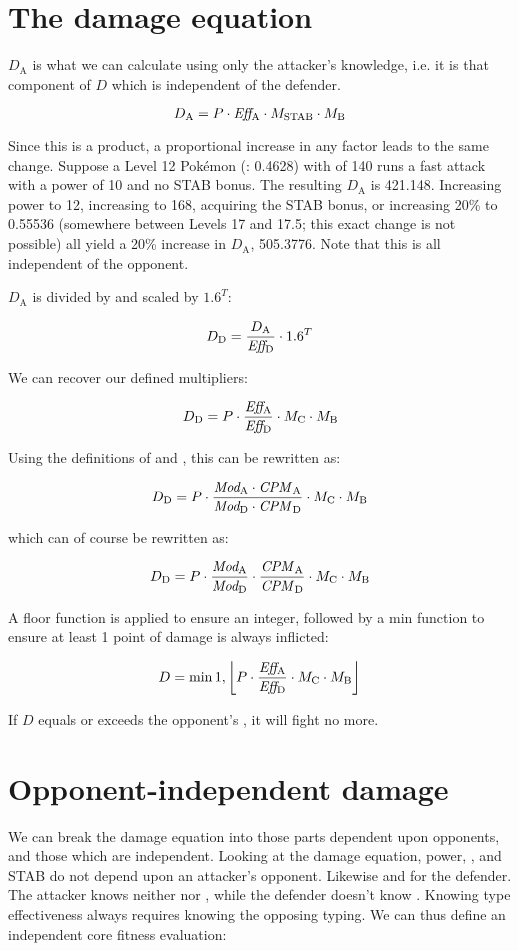 \section{The damage equation\label{sec:damage}}

$D_\mathrm{A}$ is what we can calculate using only the attacker's knowledge, i.e.
 it is that component of $D$ which is independent of the defender.

\[ D_\mathrm{A} = P \cdot \mbox{$\mathit{Eff_\mathrm{A}}$} \cdot M_\mathrm{STAB} \cdot M_\mathrm{B} \]

Since this is a product, a proportional increase in any factor leads to
 the same change.
Suppose a Level 12 Pokémon (\CPM: 0.4628) with  of 140 runs
  a fast attack with a power of 10 and no STAB bonus.
The resulting $D_\mathrm{A}$ is 421.148.
Increasing power to 12,
 increasing  to 168,
 acquiring the STAB bonus,
 or increasing \CPM{} 20\% to 0.55536 (somewhere between Levels 17 and 17.5; this exact change is not possible)
 all yield a 20\% increase in $D_\mathrm{A}$, 505.3776.
Note that this is all independent of the opponent.

$D_\mathrm{A}$ is divided by  and scaled by $1.6^T$:

\[ D_\mathrm{D} = \frac{D_\mathrm{A}}{\mbox{$\mathit{Eff_\mathrm{D}}$}} \cdot 1.6^T \]

We can recover our defined multipliers:

\[ D_\mathrm{D} = P \cdot \frac{\mbox{$\mathit{Eff_\mathrm{A}}$}}{\mbox{$\mathit{Eff_\mathrm{D}}$}} \cdot M_\mathrm{C} \cdot M_\mathrm{B} \]

Using the definitions of  and , this can be rewritten as:

\[ D_\mathrm{D} = P \cdot \frac{\mbox{$\mathit{Mod_\mathrm{A}}$} \cdot \mbox{$\mathit{CPM}$}_\mathrm{A}}{\mbox{$\mathit{Mod_\mathrm{D}}$} \cdot \mbox{$\mathit{CPM}$}_\mathrm{D}} \cdot M_\mathrm{C} \cdot M_\mathrm{B} \]

which can of course be rewritten as:

\[ D_\mathrm{D} = P \cdot \frac{\mbox{$\mathit{Mod_\mathrm{A}}$}}{\mbox{$\mathit{Mod_\mathrm{D}}$}} \cdot \frac{\mbox{$\mathit{CPM}$}_\mathrm{A}}{\mbox{$\mathit{CPM}$}_\mathrm{D}} \cdot M_\mathrm{C} \cdot M_\mathrm{B} \]

A floor function is applied to ensure an integer,
 followed by a min function to ensure at least 1 point of damage is always inflicted:

 \[ D = \min{1, \left\lfloor P \cdot \frac{\mbox{$\mathit{Eff_\mathrm{A}}$}}{\mbox{$\mathit{Eff_\mathrm{D}}$}} \cdot M_\mathrm{C} \cdot M_\mathrm{B} \right\rfloor } \]

If $D$ equals or exceeds the opponent's \HP, it will fight no more.

\section{Opponent-independent damage}
We can break the damage equation into those parts dependent upon opponents, and those which are independent.
Looking at the damage equation, power, , and STAB do not depend upon an attacker's opponent.
Likewise  and \MHP{} for the defender.
The attacker knows neither  nor \MHP, while the defender doesn't know .
Knowing type effectiveness always requires knowing the opposing typing.
We can thus define an independent core fitness evaluation:


